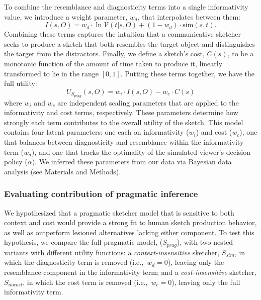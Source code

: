 \documentclass[9pt,twocolumn,twoside]{pnas-new}
\begin{document}
To combine the resemblance and diagnosticity terms into a single informativity value, we introduce a weight parameter, $w_{d}$, that interpolates between them:
\begin{equation} \label{prag_interpolation}
I(s,O) = w_{d} \cdot \ln \mathcal{V}(t|s,O) + (1-w_{d}) \cdot \textrm{sim}(s,t). 
\end{equation} 
Combining these terms captures the intuition that a communicative sketcher seeks to produce a sketch that both resembles the target object and distinguishes the target from the distractors.
Finally, we define a sketch's cost, $C(s)$, to be a monotonic function of the amount of time taken to produce it, linearly transformed to lie in the range $[0,1]$. 
Putting these terms together, we have the full utility:
\begin{equation} \label{sketcher_utility}
U_{S_{prag}}(s,O) = w_i \cdot I(s,O) - w_c \cdot  C(s)
\end{equation}
where $w_i$ and $w_c$ are independent scaling parameters that are applied to the informativity and cost terms, respectively.
These parameters determine how strongly each term contributes to the overall utility of the sketch. 
This model contains four latent parameters: one each on informativity ($w_{i}$) and cost ($w_{c}$), one that balances between diagnosticity and resemblance within the informativity term ($w_{d}$), and one that tracks the optimality of the simulated viewer's decision policy ($\alpha$). 
We inferred these parameters from our data via Bayesian data analysis (see Materials and Methods).


\subsubsection*{Evaluating contribution of pragmatic inference}

We hypothesized that a pragmatic sketcher model that is sensitive to both context and cost would provide a strong fit to human sketch production behavior, as well as outperform lesioned alternatives lacking either component.
To test this hypothesis, we compare the full pragmatic model, ($S_{prag}$), with two nested variants with different utility functions:
a \textit{context-insensitive} sketcher, $S_{sim}$, in which the diagnosticity term is removed (i.e.,~$w_{d}{=}0$), leaving only the resemblance component in the informativity term; and  
a \textit{cost-insensitive} sketcher, $S_{nocost}$, in which the cost term is removed (i.e.,~$w_c=0$), leaving only the full informativity term. 
\end{document}
